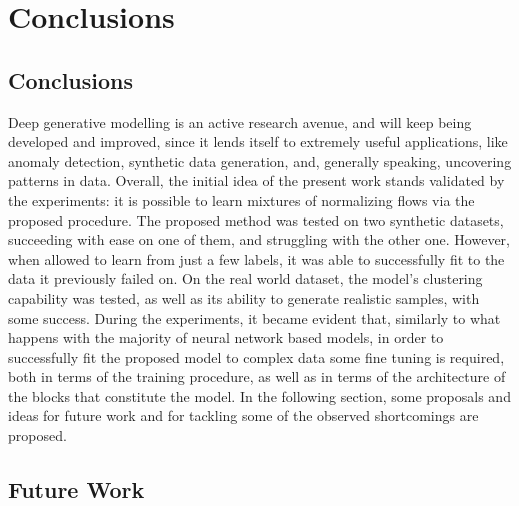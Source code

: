 \chapter{Conclusions}
\label{chapter:conclusions}

\section{Conclusions}
\label{section:conclusions}
Deep generative modelling is an active research avenue, and will keep being
developed and improved, since it lends itself to extremely useful applications,
like anomaly detection, synthetic data generation, and, generally speaking,
uncovering patterns in data.
Overall, the initial idea of the present work stands validated by the experiments:
it is possible to learn mixtures of normalizing flows via the proposed procedure.
The proposed method was tested on two synthetic datasets, succeeding with ease
on one of them, and struggling with the other one. However, when allowed to learn
from just a few labels, it was able to successfully fit to the data it previously
failed on. On the real world dataset, the model's clustering capability was tested,
as well as its ability to generate realistic samples, with some success.
During the experiments, it became evident that, similarly to what happens with
the majority of neural network based models, in order to successfully fit the
proposed model to complex data some fine tuning is required, both in terms of the
training procedure, as well as in terms of the architecture of the blocks that
constitute the model. In the following section, some proposals and ideas for
future work and for tackling some of the observed shortcomings are proposed.

\section{Future Work}
\label{section:future}

